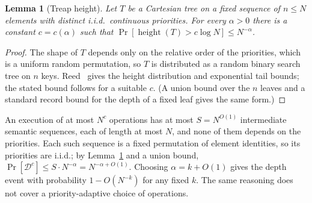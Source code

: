 ﻿\documentclass[11pt]{article}
\theoremstyle{plain}
\newtheorem{lemma}[theorem]{Lemma}
\theoremstyle{remark}
\begin{document}
\begin{lemma}[Treap height]\label{treapheight}
Let $T$ be a Cartesian tree on a fixed sequence of $n\le N$ elements with distinct i.i.d.\ continuous priorities. For every $\alpha>0$ there is a constant $c=c(\alpha)$ such that $\Pr[\operatorname{height}(T)>c\log N]\le N^{-\alpha}$.
\end{lemma}
\begin{proof}
The shape of $T$ depends only on the relative order of the priorities, which is a uniform random permutation, so $T$ is distributed as a random binary search tree on $n$ keys. Reed~\cite{Reed03} gives the height distribution and exponential tail bounds; the stated bound follows for a suitable $c$. (A union bound over the $n$ leaves and a standard record bound for the depth of a fixed leaf gives the same form.)
\end{proof}

An execution of at most $N^c$ operations has at most $S=N^{O(1)}$ intermediate semantic sequences, each of length at most $N$, and none of them depends on the priorities. Each such sequence is a fixed permutation of element identities, so its priorities are i.i.d.; by Lemma~\ref{treapheight} and a union bound, $\Pr[\mathcal D^c]\le S\cdot N^{-\alpha}=N^{-\alpha+O(1)}$. Choosing $\alpha=k+O(1)$ gives the depth event with probability $1-O(N^{-k})$ for any fixed $k$. The same reasoning does not cover a priority-adaptive choice of operations.
\end{document}
